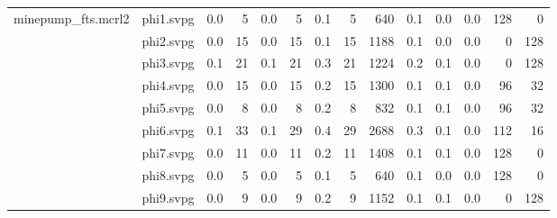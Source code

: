 \documentclass{standalone}
\begin{document}
\begin{tabular}{r r|r r|r r|r r r|r r r|r r}
minepump\_fts.mcrl2 & phi1.svpg                 & 0.0 & 5 & 0.0 & 5 & 0.1 & 5 & 640 & 0.1 & 0.0 & 0.0 & 128 & 0 \\
 & phi2.svpg                 & 0.0 & 15 & 0.0 & 15 & 0.1 & 15 & 1188 & 0.1 & 0.0 & 0.0 & 0 & 128 \\
 & phi3.svpg                 & 0.1 & 21 & 0.1 & 21 & 0.3 & 21 & 1224 & 0.2 & 0.1 & 0.0 & 0 & 128 \\
 & phi4.svpg                 & 0.0 & 15 & 0.0 & 15 & 0.2 & 15 & 1300 & 0.1 & 0.1 & 0.0 & 96 & 32 \\
 & phi5.svpg                 & 0.0 & 8 & 0.0 & 8 & 0.2 & 8 & 832 & 0.1 & 0.1 & 0.0 & 96 & 32 \\
 & phi6.svpg                 & 0.1 & 33 & 0.1 & 29 & 0.4 & 29 & 2688 & 0.3 & 0.1 & 0.0 & 112 & 16 \\
 & phi7.svpg                 & 0.0 & 11 & 0.0 & 11 & 0.2 & 11 & 1408 & 0.1 & 0.1 & 0.0 & 128 & 0 \\
 & phi8.svpg                 & 0.0 & 5 & 0.0 & 5 & 0.1 & 5 & 640 & 0.1 & 0.0 & 0.0 & 128 & 0 \\
 & phi9.svpg                 & 0.0 & 9 & 0.0 & 9 & 0.2 & 9 & 1152 & 0.1 & 0.1 & 0.0 & 0 & 128 \\
\end{tabular}
\end{document}
